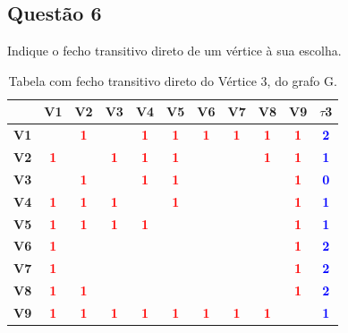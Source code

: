 \documentclass{report}
\begin{document}
\subsection{Questão 6}
Indique o fecho transitivo direto de um vértice à sua escolha.\\
\cite{TeXnicCenter_2006}

\begin{table}[h]
    \centering
     \begin{tabular}{|c|c|c|c|c|c|c|c|c|c|c|}
        \hline
         & \textbf{V1} & \textbf{V2} & \textbf{V3} & \textbf{V4} & \textbf{V5} & \textbf{V6} & \textbf{V7} & \textbf{V8} & \textbf{V9} & \textit{\textbf{$\tau$}}3  \\
        \hline 
        \textbf{V1} &  & \textbf{\textcolor{red}{1}} &  & \textbf{\textcolor{red}{1}} & \textbf{\textcolor{red}{1}} & \textbf{\textcolor{red}{1}} & \textbf{\textcolor{red}{1}} & \textbf{\textcolor{red}{1}} & \textbf{\textcolor{red}{1}} & \textbf{\textcolor{blue}{2}}\\ 
        \hline
       \textbf{V2} & \textbf{\textcolor{red}{1}} &  & \textbf{\textcolor{red}{1}} & \textbf{\textcolor{red}{1}} & \textbf{\textcolor{red}{1}} &  &  & \textbf{\textcolor{red}{1}} & \textbf{\textcolor{red}{1}} & \textbf{\textcolor{blue}{1}} \\
        \hline
       \textbf{V3} &  & \textbf{\textcolor{red}{1}} &  & \textbf{\textcolor{red}{1}} & \textbf{\textcolor{red}{1}} &  &  &  & \textbf{\textcolor{red}{1}} & \textbf{\textcolor{blue}{0}}\\
        \hline
       \textbf{V4} & \textbf{\textcolor{red}{1}} & \textbf{\textcolor{red}{1}} & \textbf{\textcolor{red}{1}} &  & \textbf{\textcolor{red}{1}} &  &  &  & \textbf{\textcolor{red}{1}} & \textbf{\textcolor{blue}{1}}\\
        \hline
        \textbf{V5} & \textbf{\textcolor{red}{1}} & \textbf{\textcolor{red}{1}} & \textbf{\textcolor{red}{1}} & \textbf{\textcolor{red}{1}} &  &  &  &  & \textbf{\textcolor{red}{1}} & \textbf{\textcolor{blue}{1}}\\
        \hline
        \textbf{V6} & \textbf{\textcolor{red}{1}} &  &  &  &  &  &  &  & \textbf{\textcolor{red}{1}} & \textbf{\textcolor{blue}{2}}\\
        \hline
        \textbf{V7} & \textbf{\textcolor{red}{1}} &  &  &  &  &  &  &  & \textbf{\textcolor{red}{1}} & \textbf{\textcolor{blue}{2}}  \\
        \hline
        \textbf{V8} & \textbf{\textcolor{red}{1}} & \textbf{\textcolor{red}{1}} &  &  &  &  &  &  & \textbf{\textcolor{red}{1}} & \textbf{\textcolor{blue}{2}} \\
        \hline
        \textbf{V9} & \textbf{\textcolor{red}{1}} & \textbf{\textcolor{red}{1}} & \textbf{\textcolor{red}{1}} & \textbf{\textcolor{red}{1}} & \textbf{\textcolor{red}{1}} & \textbf{\textcolor{red}{1}} & \textbf{\textcolor{red}{1}} & \textbf{\textcolor{red}{1}} & & \textbf{\textcolor{blue}{1}} \\
        \hline
      \end{tabular}
    \caption{Tabela com fecho transitivo direto do Vértice 3, do grafo G.}
\end{table}
\newpage
\end{document}
